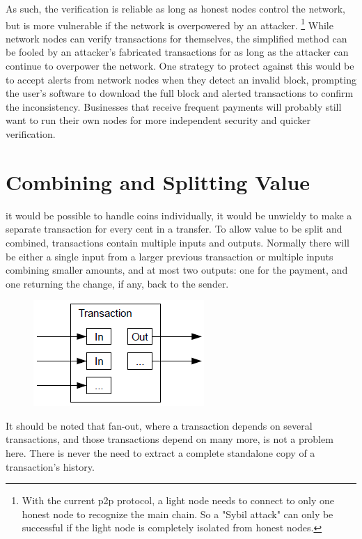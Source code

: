 \documentclass[nohyper]{tufte-handout}
\begin{document}
As such, the verification is reliable as long as honest nodes control
the network, but is more vulnerable if the network is overpowered by an
attacker.  \footnote[][-0.5in]{With the current p2p protocol, a light node needs to connect to only one honest node to recognize the main chain.  So a "Sybil attack" can only be successful if the light node is completely isolated from honest nodes.} While network nodes can verify transactions for themselves,
the simplified method can be fooled by an attacker's fabricated
transactions for as long as the attacker can continue to overpower the
network. One strategy to protect against this would be to accept alerts
from network nodes when they detect an invalid block, prompting the
user's software to download the full block and alerted transactions to
confirm the inconsistency. Businesses that receive frequent payments
will probably still want to run their own nodes for more independent
security and quicker verification.

\section{Combining and Splitting
Value}\label{combining-and-splitting-value}

 it would be possible to handle coins individually, it would be
unwieldy to make a separate transaction for every cent in a transfer. To
allow value to be split and combined, transactions contain multiple
inputs and outputs. Normally there will be either a single input from a
larger previous transaction or multiple inputs combining smaller
amounts, and at most two outputs: one for the payment, and one returning
the change, if any, back to the sender.

\begin{figure}[!h]
\centering
\includegraphics[width=0.3725\linewidth]{combining-splitting.png}

\end{figure}

It should be noted that fan-out, where a transaction depends on several
transactions, and those transactions depend on many more, is not a
problem here. There is never the need to extract a complete standalone
copy of a transaction's history.
\end{document}
